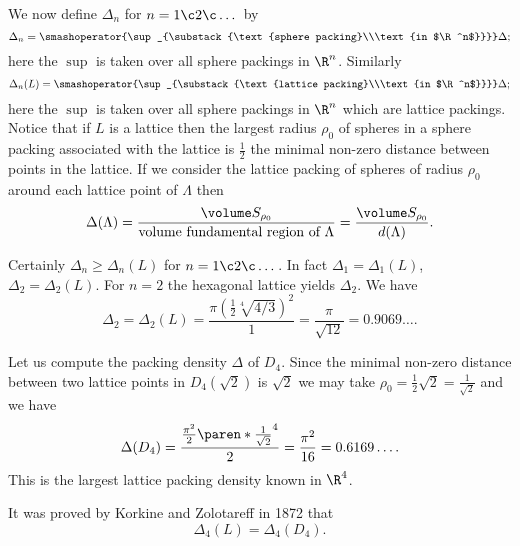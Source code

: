 We now define $\Delta_n$ for $n=1\c 2\c \dotsc$ by
\[ \Delta_n = \smashoperator{\sup_{\substack{\text{sphere packing}\\\text{in $\R^n$}}}}\Delta ; \]
here the $\sup$ is taken over all sphere packings in $\R^n$.  Similarly
\[ \Delta_n(L) = \smashoperator{\sup_{\substack{\text{lattice packing}\\\text{in $\R^n$}}}}\Delta ; \]
here the $\sup$ is taken over all sphere packings in $\R^n$ which are lattice packings.  Notice that if $L$ is a lattice then the largest radius $\rho_0$ of spheres in a sphere packing associated with the lattice is $\frac12$ the minimal non-zero distance between points in the lattice.  If we consider the lattice packing of spheres of radius $\rho_0$ around each lattice point of $\Lambda$ then
\[ \Delta(\Lambda) = \frac{\volume S_{\rho_0}}{\text{volume fundamental region of $\Lambda$}} = \frac{\volume S_{\rho_0}}{d(\Lambda)} . \]

Certainly $\Delta_n\geq\Delta_n(L)$ for $n=1\c 2\c \dotsc$.  In fact $\Delta_1=\Delta_1(L)$, $\Delta_2=\Delta_2(L)$.  For $n=2$ the hexagonal lattice yields $\Delta_2$.  We have
\[ \Delta_2 = \Delta_2(L) = \frac{\pi(\frac12\sqrt[4]{4/3})^2}{1} = \frac{\pi}{\sqrt{12}} = 0.9069\ldots . \]

Let us compute the packing density $\Delta$ of $D_4$.  Since the minimal non-zero distance between two lattice points in $D_4(\sqrt2)$ is $\sqrt2$ we may take $\rho_0=\frac12\sqrt2=\frac{1}{\sqrt2}$ and we have
\[ \Delta(D_4) = \frac{\frac{\pi^2}{2}\paren*{\frac{1}{\sqrt2}}^4}{2} = \frac{\pi^2}{16} = 0.6169\ldots . \]
This is the largest lattice packing density known in $\R^4$.

It was proved by Korkine and Zolotareff in 1872 that
\[ \Delta_4(L) = \Delta_4(D_4) . \]
%
\vspace{-\baselineskip}